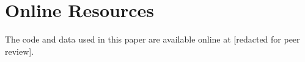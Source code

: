 \documentclass[manuscript,screen,review,acmsmall]{acmart}
\begin{document}
\begin{acks}
\end{acks}




\appendix

\section{Online Resources}
The code and data used in this paper are available online at [redacted for peer review].
\end{document}
